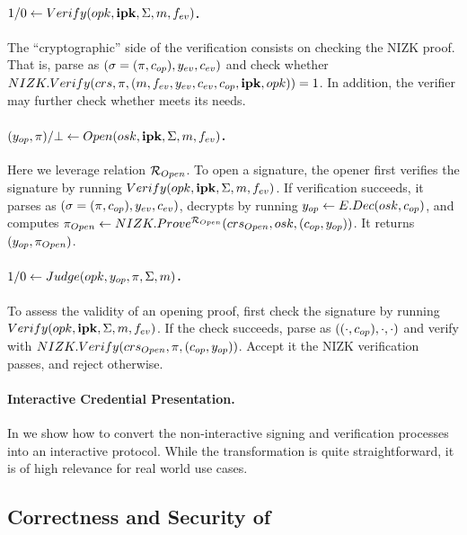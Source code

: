 \paragraph{$1/0 \gets Verify(opk,\mathbf{ipk},\Sigma,m,f_{ev})$.} %
The ``cryptographic'' side of the verification consists on checking
the NIZK proof. That is, parse \Sig as $(\sigma = (\pi,c_{op}),y_{ev},
c_{ev})$ and check whether $NIZK.Verify(crs,\pi,(m,f_{ev},y_{ev},
c_{ev},c_{op},\mathbf{ipk},opk)) = 1$. In addition, the verifier may further check
whether \yeval meets its needs.

\paragraph{$(y_{op},\pi)/\bot \gets
  Open(osk,\mathbf{ipk},\Sigma,m,f_{ev})$.} %
Here we leverage relation $\mathcal{R}_{Open}$.
%
To open a signature, the opener first verifies the signature by running $Verify
(opk,\mathbf{ipk}, \Sigma,m,f_{ev})$. If verification succeeds, it parses
\Sig as $(\sigma=(\pi,c_{op}),y_{ev},c_{ev})$, decrypts \Ec by running $y_{op}
\gets E.Dec(osk,c_{op})$, and computes $\pi_{Open} \gets
NIZK.Prove^{\mathcal{R}_{Open}}(crs_{Open},osk,(c_{op},y_{op}))$. It
returns $(y_{op},\pi_{Open})$.

\paragraph{$1/0 \gets Judge(opk,y_{op},\pi,\Sigma,m)$.} %
To assess the validity of an opening proof, first check the signature
by running $Verify(opk,\mathbf{ipk},\Sigma,m,f_{ev})$. If the check succeeds,
parse \Sig as $((\cdot,c_{op}),\cdot,\cdot)$ and verify \NIZKproof with
$NIZK.Verify(crs_{Open},\pi,(c_{op},y_{op}))$. Accept it the NIZK
verification passes, and reject otherwise.

\paragraph{Interactive Credential Presentation.} In 
we show how to convert the non-interactive signing and verification processes
into an interactive protocol. While the transformation is quite straightforward,
it is of high relevance for real world use cases.

\subsection{Correctness and Security of \CUASGen}
\label{ssec:security-uas}

